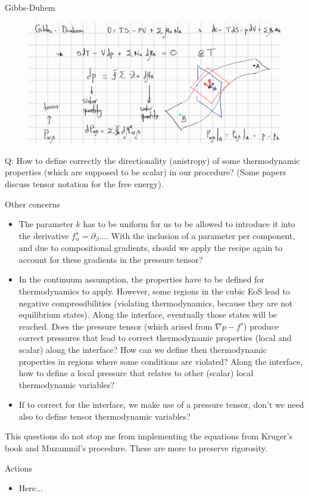 \documentclass[8pt]{beamer}
\begin{document}
	\begin{frame}{Gibbs-Duhem}
		\begin{figure}
			\includegraphics[width=\textwidth]{pics/pressureTensorDraw.png}
		\end{figure}
	
		Q: How to define correctly the directionality (anistropy) of some thermodynamic properties (which are supposed to be scalar) in our procedure? (Some papers discuss tensor notation for the free energy). 
	\end{frame}
	
	\begin{frame}{Other concerns}
		\begin{itemize}
			\item The parameter $k$ has to be uniform for us to be allowed to introduce it into the derivative $f^s_\alpha = \partial_\beta...$. With the inclusion of a parameter per component, and due to compositional gradients, should we apply the recipe again to account for these gradients in the pressure tensor?
			
			\item In the continuum assumption, the properties have to be defined for thermodynamics to apply. However, some regions in the cubic EoS lead to negative compressibilities (violating thermodynamics, because they are not equilibrium states). Along the interface, eventually those states will be reached. Does the pressure tensor (which arised from $\nabla p - f^s$) produce correct pressures that lead to correct thermodynamic properties (local and scalar) along the interface? How can we define then thermodynamic properties in regions where some conditions are violated? Along the interface, how to define a local pressure that relates to other (scalar) local thermodynamic variables?
			
			\item If to correct for the interface, we make use of a pressure tensor, don't we need also to define tensor thermodynamic variables?
			
		\end{itemize}
	
		This questions do not stop me from implementing the equations from Kruger's book and Muzammil's procedure. These are more to preserve rigorosity. 
	\end{frame}
	\begin{frame}{Actions}
		\begin{itemize}
			\item Here...
		\end{itemize}
	\end{frame}
	
\end{document}
